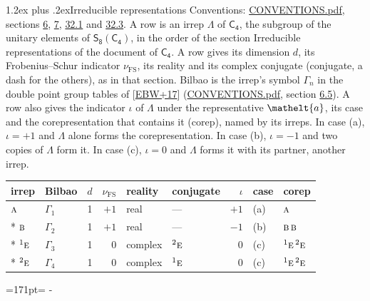 \documentclass[10pt,a4paper]{article}
\makeatletter
\renewcommand\section{\@startsection{section}{1}{\z@}{-3ex plus -1ex minus -.2ex}%
  {1.2ex plus .2ex}{\normalfont\large\sffamily\bfseries\color{parttitle}}}
\newcommand{\needspace}[1]{\par\penalty-100\begingroup\dimen0=#1\relax\dimen2=\pagegoal
  \advance\dimen2-\pagetotal\ifdim\dimen0>\dimen2\relax\ifdim\dimen2>0pt\vfil\break\fi\fi
  \endgroup}
\numberwithin{equation}{section}
\newcommand{\eltfont}[1]{{\let\sigma\eltsigma\mathelt{#1}}}
\newcommand{\grp}[1]{\mathsf{#1}}
\newcommand{\irr}[1]{\text{\normalfont\scshape #1}}
\newcommand{\conjpair}[1]{{}^{#1}}
\newcommand{\elt}[1]{\eltfont{#1}}
\newcommand{\fsind}{\nu_{\mathrm{FS}}}
\makeatother
\begin{document}
\section{Irreducible representations}\label{s:irreps}
Conventions: \href{../../CONVENTIONS.pdf}{CONVENTIONS.pdf}, sections \href{../../../rotation/CONVENTIONS.pdf\#conv.6}{6}, \href{../../../rotation/CONVENTIONS.pdf\#conv.7}{7}, \href{../../CONVENTIONS.pdf\#conv.32.1}{32.1} and \href{../../CONVENTIONS.pdf\#conv.32.3}{32.3}.
\leavevmode\label{n:irrep.Delta}A row is an irrep $\Lambda$ of $\grp{C_{4}}$, the subgroup of the unitary elements of $\grp{S_{8}}(\grp{C_{4}})$, in the order of the section Irreducible representations of the document of \href{../../../rotation/data/pdf/C4.pdf}{$\grp{C_{4}}$}. \label{n:index.dimension}\label{n:index.frobenius}\label{n:head.irrep}\label{n:head.reality}\label{n:head.conjugate}A row gives its dimension $d$, its Frobenius--Schur indicator $\fsind$, its reality and its complex conjugate (conjugate, a dash for the others), as in that section. \label{n:head.bilbao}\label{n:irrep.alias.gamma}Bilbao is the irrep's symbol $\Gamma_n$ in the double point group tables of [\href{../../../REFERENCES.pdf\#ref.EBW+17}{EBW+17}] (\href{../../CONVENTIONS.pdf}{CONVENTIONS.pdf}, section \href{../../../rotation/CONVENTIONS.pdf\#conv.6.5}{6.5}). \label{n:head.case.corep}\label{n:head.corep}A row also gives the indicator $\iota$ of $\Lambda$ under the representative $\elt{a}$, its case and the corepresentation that contains it (corep), named by its irreps. In case (a), $\iota = +1$ and $\Lambda$ alone forms the corepresentation. In case (b), $\iota = -1$ and two copies of $\Lambda$ form it. In case (c), $\iota = 0$ and $\Lambda$ forms it with its partner, another irrep.
\setlength{\emergencystretch}{2em}\par\setlength{\emergencystretch}{0pt}
{\small\renewcommand{\arraystretch}{1.25}\setlength{\tabcolsep}{4pt}\begin{longtable}{@{}llrrllrll@{}}\toprule
irrep & Bilbao & $d$ & $\fsind$ & reality & conjugate & $\iota$ & case & corep\\\midrule\endhead
\bottomrule\endfoot\endlastfoot
$\irr{a}$ & $\Gamma_{1}$ & 1 & $+1$ & real & --- & $+1$ & (a) & $\irr{a}$\\*
$\irr{b}$ & $\Gamma_{2}$ & 1 & $+1$ & real & --- & $-1$ & (b) & $\irr{b}\,\irr{b}$\\*
$\conjpair{1}\irr{e}$ & $\Gamma_{3}$ & 1 & $0$ & complex & $\conjpair{2}\irr{e}$ & $0$ & (c) & $\conjpair{1}\irr{e}\,\conjpair{2}\irr{e}$\\*
$\conjpair{2}\irr{e}$ & $\Gamma_{4}$ & 1 & $0$ & complex & $\conjpair{1}\irr{e}$ & $0$ & (c) & $\conjpair{1}\irr{e}\,\conjpair{2}\irr{e}$\\
\bottomrule\end{longtable}}
\needspace{171pt}
\end{document}
